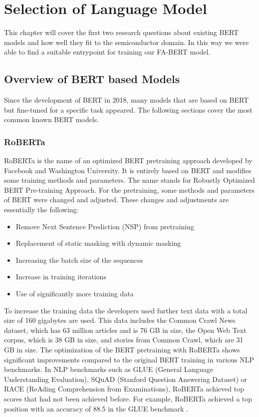 \chapter{Selection of Language Model} \label{chapter:analysis}
This chapter will cover the first two research questions about existing BERT models and how well they fit to the semiconductor domain. In this way we were able to find a suitable entrypoint for training our FA-BERT model.

\section{Overview of BERT based Models}
Since the development of BERT in 2018, many models that are based on BERT but fine-tuned for a specific task appeared. The following sections cover the most common known BERT models.

\subsection{RoBERTa}
RoBERTa is the name of an optimized BERT pretraining approach developed by Facebook and Washington University. It is entirely based on BERT and modifies some training methods and parameters. The name stands for Robustly Optimized BERT Pre-training Approach. For the pretraining, some methods and parameters of BERT were changed and adjusted. These changes and adjustments are essentially the following:

\begin{itemize}
	\item Remove Next Sentence Prediction (NSP) from pretraining
	\item Replacement of static masking with dynamic masking
	\item Increasing the batch size of the sequences
	\item Increase in training iterations
	\item Use of significantly more training data
\end{itemize}

To increase the training data the developers used further text data with a total size of 160 gigabytes are used. This data includes the Common Crawl News dataset, which has 63 million articles and is 76 GB in size, the Open Web Text corpus, which is 38 GB in size, and stories from Common Crawl, which are 31 GB in size. \newline
The optimization of the BERT pretraining with RoBERTa shows significant improvements compared to the original BERT training in various NLP benchmarks. In NLP benchmarks such as GLUE (General Language Understanding Evaluation), SQuAD (Stanford Question Answering Dataset) or RACE (ReAding Comprehension from Examinations), RoBERTa achieved top scores that had not been achieved before. For example, RoBERTa achieved a top position with an accuracy of 88.5 in the GLUE benchmark \cite{Liu}.

